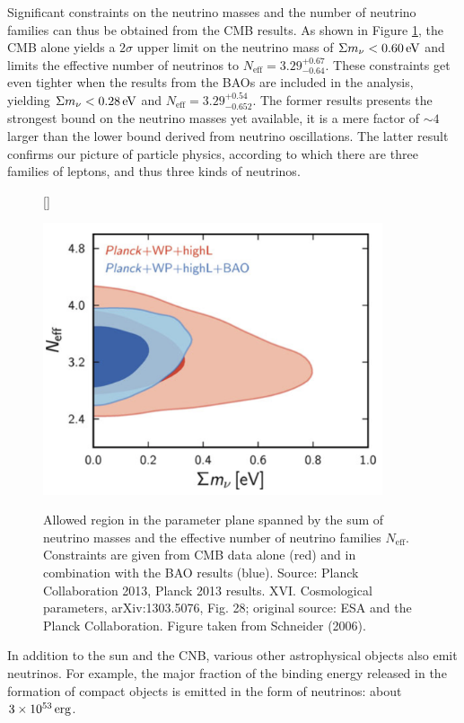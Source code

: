 \documentclass[a4paper,11pt]{article}
\begin{document}
{\noindent}Significant constraints on the neutrino masses and the number of neutrino families can thus be obtained from the CMB results. As shown in Figure \ref{fig:neutrinomasses}, the CMB alone yields a $2\sigma$ upper limit on the neutrino mass of $\Sigma m_\nu<0.60\,{\rm eV}$ and limits the effective number of neutrinos to $N_\mathrm{eff}=3.29^{+0.67}_{-0.64}$. These constraints get even tighter when the results from the BAOs are included in the analysis, yielding $\Sigma m_\nu<0.28\,{\rm eV}$ and $N_\mathrm{eff}=3.29^{+0.54}_{-0.652}$. The former results presents the strongest bound on the neutrino masses yet available, it is a mere factor of $\sim4$ larger than the lower bound derived from neutrino oscillations. The latter result confirms our picture of particle physics, according to which there are three families of leptons, and thus three kinds of neutrinos. 

\begin{figure}[t]
    [\FBwidth]
    {\caption{\footnotesize{Allowed region in the parameter plane spanned by the sum of neutrino masses and the effective number of neutrino families $N_\mathrm{eff}$. Constraints are given from CMB data alone (red) and in combination with the BAO results (blue). Source: Planck Collaboration 2013, Planck 2013 results. XVI. Cosmological parameters, arXiv:1303.5076, Fig. 28; original source: ESA and the Planck Collaboration. Figure taken from Schneider (2006).}}
    \label{fig:neutrinomasses}}
    {\includegraphics[width=10cm]{figures/neutrinomasses.png}}
\end{figure}

{\noindent}In addition to the sun and the CNB, various other astrophysical objects also emit neutrinos. For example, the major fraction of the binding energy released in the formation of compact objects is emitted in the form of neutrinos: about $3\times10^{53}\,{\rm erg}$.
\end{document}
